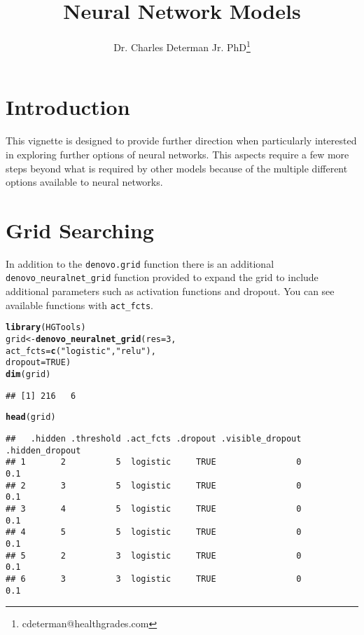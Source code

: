 \documentclass[12pt]{article}\usepackage[]{graphicx}\usepackage[]{color}
\makeatletter
\newcommand{\hlnum}[1]{\textcolor[rgb]{0.686,0.059,0.569}{#1}}%
\newcommand{\hlstr}[1]{\textcolor[rgb]{0.192,0.494,0.8}{#1}}%
\newcommand{\hlstd}[1]{\textcolor[rgb]{0.345,0.345,0.345}{#1}}%
\newcommand{\hlkwb}[1]{\textcolor[rgb]{0.69,0.353,0.396}{#1}}%
\newcommand{\hlkwc}[1]{\textcolor[rgb]{0.333,0.667,0.333}{#1}}%
\newcommand{\hlkwd}[1]{\textcolor[rgb]{0.737,0.353,0.396}{\textbf{#1}}}%
\newenvironment{kframe}{%
 \def\at@end@of@kframe{}%
 \ifinner\ifhmode%
  \def\at@end@of@kframe{\end{minipage}}%
  \begin{minipage}{\columnwidth}%
 \fi\fi%
 \def\FrameCommand##1{\hskip\@totalleftmargin \hskip-\fboxsep
 \colorbox{shadecolor}{##1}\hskip-\fboxsep
     \hskip-\linewidth \hskip-\@totalleftmargin \hskip\columnwidth}%
 \MakeFramed {\advance\hsize-\width
   \@totalleftmargin\z@ \linewidth\hsize
   \@setminipage}}%
 {\par\unskip\endMakeFramed%
 \at@end@of@kframe}
\newenvironment{knitrout}{}{} %
\newcommand{\Rcode}[1]{\texttt{#1}}
\newcommand{\Rfunction}[1]{\Rcode{#1}}
\makeatother
\begin{document}
\title{Neural Network Models}
\author{Dr. Charles Determan Jr. PhD\footnote{cdeterman@healthgrades.com}}
\newpage

\maketitle
\section{Introduction}
This vignette is designed to provide further direction when particularly interested
in exploring further options of neural networks.  This aspects require a few more
steps beyond what is required by other models because of the multiple different
options available to neural networks.


\newpage
\maketitle
\section{Grid Searching}
In addition to the \Rfunction{denovo.grid} function there is an additional 
\Rfunction{denovo\_neuralnet\_grid} function provided to expand the grid to include additional 
parameters such as activation functions and dropout.  You can see available functions with 
\Rfunction{act\_fcts}.

\begin{knitrout}
\color{fgcolor}\begin{kframe}
\begin{alltt}
\hlkwd{library}\hlstd{(HGTools)}
\hlstd{grid} \hlkwb{<-} \hlkwd{denovo_neuralnet_grid}\hlstd{(}\hlkwc{res} \hlstd{=} \hlnum{3}\hlstd{,}
                              \hlkwc{act_fcts} \hlstd{=} \hlkwd{c}\hlstd{(}\hlstr{"logistic"}\hlstd{,} \hlstr{"relu"}\hlstd{),}
                              \hlkwc{dropout}\hlstd{=}\hlnum{TRUE}\hlstd{)}
\hlkwd{dim}\hlstd{(grid)}
\end{alltt}
\begin{verbatim}
## [1] 216   6
\end{verbatim}
\begin{alltt}
\hlkwd{head}\hlstd{(grid)}
\end{alltt}
\begin{verbatim}
##   .hidden .threshold .act_fcts .dropout .visible_dropout .hidden_dropout
## 1       2          5  logistic     TRUE                0             0.1
## 2       3          5  logistic     TRUE                0             0.1
## 3       4          5  logistic     TRUE                0             0.1
## 4       5          5  logistic     TRUE                0             0.1
## 5       2          3  logistic     TRUE                0             0.1
## 6       3          3  logistic     TRUE                0             0.1
\end{verbatim}
\end{kframe}
\end{knitrout}
\end{document}
